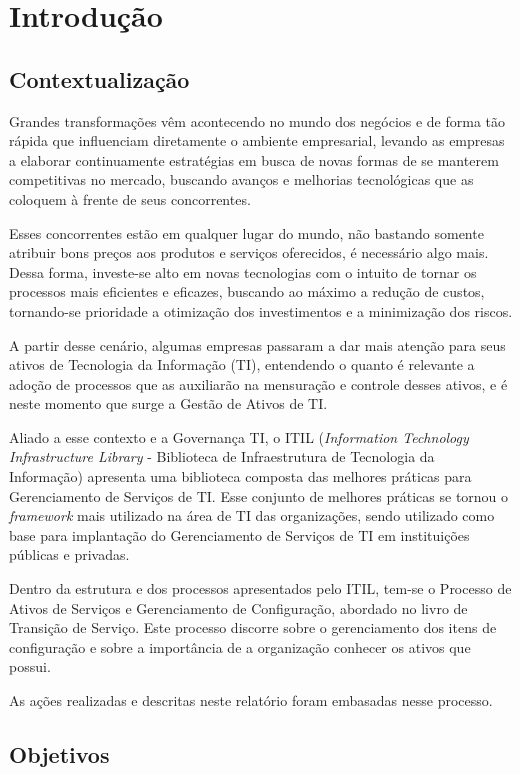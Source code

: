 \chapter{Introdução}


\section{Contextualização}
Grandes transformações vêm acontecendo no mundo dos negócios e de forma tão rápida que influenciam diretamente o ambiente empresarial, levando as empresas a elaborar continuamente estratégias em busca de novas formas de se manterem competitivas no mercado, buscando avanços e melhorias tecnológicas que as coloquem à frente de seus concorrentes.

Esses concorrentes estão em qualquer lugar do mundo, não bastando somente atribuir bons preços aos produtos e serviços oferecidos, é necessário algo mais. Dessa forma, investe-se alto em novas tecnologias com o intuito de tornar os processos mais eficientes e eficazes, buscando ao máximo a redução de custos, tornando-se prioridade a otimização dos investimentos e a minimização dos riscos.

A partir desse cenário, algumas empresas passaram a dar mais atenção para seus ativos de Tecnologia da Informação (TI), entendendo o quanto é relevante a adoção de processos que as auxiliarão na mensuração e controle desses ativos, e é neste momento que surge a Gestão de Ativos de TI.

Aliado a esse contexto e a Governança TI, o ITIL (\textit{Information Technology Infrastructure Library} - Biblioteca de Infraestrutura de Tecnologia da Informação) apresenta uma biblioteca composta das melhores práticas para Gerenciamento de Serviços de TI. Esse conjunto de melhores práticas se tornou o \textit{framework} mais utilizado na área de TI das organizações, sendo utilizado como base para implantação do Gerenciamento de Serviços de TI em instituições públicas e privadas.

Dentro da estrutura e dos processos apresentados pelo ITIL, tem-se o Processo de Ativos de Serviços e Gerenciamento de Configuração, abordado no livro de Transição de Serviço. Este processo discorre sobre o gerenciamento dos itens de configuração e sobre a importância de a organização conhecer os ativos que possui.

As ações realizadas e descritas neste relatório foram embasadas nesse processo.

\section{Objetivos}

